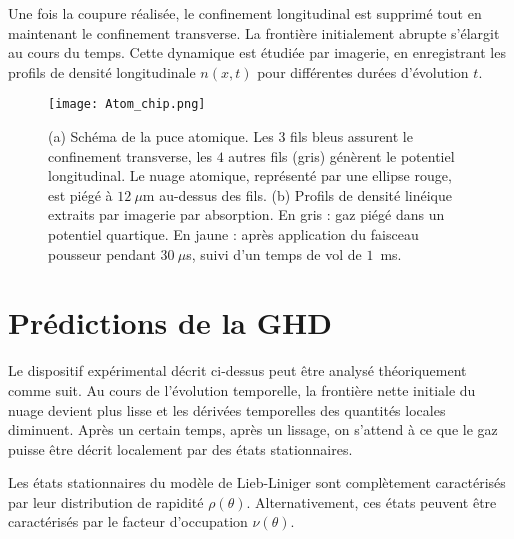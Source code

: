 Une fois la coupure réalisée, le confinement longitudinal est supprimé tout en maintenant le confinement transverse. La frontière initialement abrupte s’élargit au cours du temps. Cette dynamique est étudiée par imagerie, en enregistrant les profils de densité longitudinale $n(x,t)$ pour différentes durées d’évolution $t$.

\begin{figure}[!htb]
\centering
\texttt{[image: Atom\_chip.png]}
\caption{(a) Schéma de la puce atomique. Les $3$ fils bleus assurent le confinement transverse, les $4$ autres fils (gris) génèrent le potentiel longitudinal. Le nuage atomique, représenté par une ellipse rouge, est piégé à $12~\mu$m au-dessus des fils. (b) Profils de densité linéique extraits par imagerie par absorption. En gris : gaz piégé dans un potentiel quartique. En jaune : après application du faisceau pousseur pendant $30~\mu$s, suivi d’un temps de vol de $1$~ms.}
\label{fig:setup}
\end{figure}

\section{Prédictions de la GHD}\label{sec.GHDpredictions}
\label{sec:ghd}

Le dispositif expérimental décrit ci-dessus peut être analysé théoriquement comme suit. Au cours de l'évolution temporelle, la frontière nette initiale du nuage devient plus lisse et les dérivées temporelles des quantités locales diminuent. Après un certain temps, après un lissage, on s'attend à ce que le gaz puisse être décrit localement par des états stationnaires.

Les états stationnaires du modèle de Lieb-Liniger sont complètement caractérisés par leur distribution de rapidité $\rho(\theta)$. Alternativement, ces états peuvent être caractérisés par le facteur d'occupation $\nu(\theta)$.%

